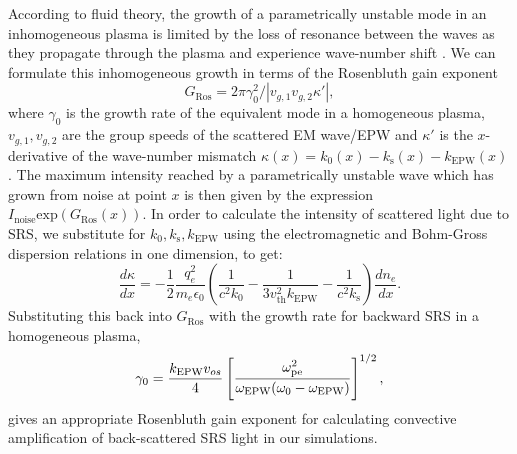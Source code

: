 According to fluid theory, the growth of a parametrically unstable mode in an inhomogeneous plasma is limited by the loss of resonance between the waves as they propagate through the plasma and experience wave-number shift \cite{Rosenbluth1972}. We can formulate this inhomogeneous growth in terms of the Rosenbluth gain exponent\cite{Rosenbluth1972}
\begin{equation}\label{eqn:GRos}
    G_\mathrm{Ros} = 2\pi\gamma_0^2/|v_{g,1}v_{g,2}\kappa'|,
\end{equation}
where $\gamma_0$ is the growth rate of the equivalent mode in a homogeneous plasma, $v_{g,1}, v_{g,2}$ are the group speeds of the scattered EM wave/EPW and $\kappa'$ is the $x$-derivative of the wave-number mismatch $\kappa(x) = k_0(x) -k_\mathrm{s}(x) -k_\mathrm{EPW}(x)$. The maximum intensity reached by a parametrically unstable wave which has grown from noise at point $x$ is then given by the expression $I_\mathrm{noise}\mathrm{exp}(G_\mathrm{Ros}(x))$. In order to calculate the intensity of scattered light due to SRS, we substitute for $k_0,k_\mathrm{s},k_\mathrm{EPW}$ using the electromagnetic and Bohm-Gross dispersion relations in one dimension, to get:
\begin{equation}\label{eqn:kappaPrime}
    \frac{d\kappa}{dx}= -\frac{1}{2}\frac{q_e^2}{m_e\epsilon_0}
    \left(\frac{1}{c^2k_0}-\frac{1}{3v_\mathrm{th}^2k_\mathrm{EPW}}-\frac{1}{c^2k_\mathrm{s}}\right)\frac{dn_e}{dx}.
\end{equation}
Substituting this back into $G_\mathrm{Ros}$ with the growth rate for backward SRS in a homogeneous plasma\cite{kruer2003},
\begin{equation}\label{eqn:gamma0}
    \centering
    \gamma_0 = \frac{k_\mathrm{EPW}v_{os}}{4}\left[\frac{\omega_{\mathrm{pe}}^2}{\omega_\mathrm{EPW}(\omega_0-\omega_\mathrm{EPW})}\right]^{1/2},
\end{equation}
gives an appropriate Rosenbluth gain exponent for calculating convective amplification of
back-scattered SRS light in our simulations.


